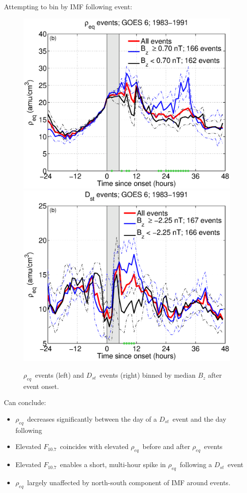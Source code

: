 \documentclass[xcolor={dvipsnames,table}]{beamer}
\newcommand{\req}{\ensuremath{\rho_{eq}}} %
\newcommand{\dst}{\ensuremath{D_{st}}} %
\newcommand{\f}{\ensuremath{F_{10.7}}} %
\begin{document}
\begin{frame}
	Attempting to bin by IMF following event:
		\begin{figure}[htp!]
			\centering
			\includegraphics[width=0.5\linewidth]{Figures/RhoBinnedB_z-case24-t025-tf30-GOES6}
			\includegraphics[width=0.5\linewidth]{Figures/RhoBinnedB_z-case1-t025-tf30-GOES6}
			\caption{\req\ events (left) and \dst\ events (right) binned by median $B_z$ after event onset.}
			\label{fig:RhoBinnedF107}
		\end{figure}
\end{frame}

\begin{frame}
	Can conclude:
	\begin{itemize}
		\item \req\ decreases significantly between the day of a \dst\ event and the day following
		\item Elevated \f\ coincides with elevated \req\ before and after \req\ events
		\item Elevated \f\ enables a short, multi-hour spike in \req\ following a \dst\ event
		\item \req\ largely unaffected by north-south component of IMF around events.
	\end{itemize}
\end{frame}
\end{document}

